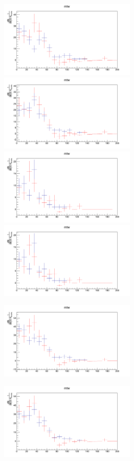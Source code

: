 \begin{figure}[H!]
\begin{center}
\includegraphics[width=6.5cm]{figures/2J1T/MTW_QCD_lessiso_vs_antiso_SR.png}
\includegraphics[width=6.5cm]{figures/2J1T/MTW_QCD_moreiso_vs_antiso_SR.png}
\includegraphics[width=6.5cm]{figures/2J1T/MTW_QCD_lessiso_vs_antiso_SB.png}
\includegraphics[width=6.5cm]{figures/2J1T/MTW_QCD_lessiso_vs_antiso_SB.png}
\includegraphics[width=6.5cm, height=4.4cm]{figures/2J1T/MTW_QCD_lessiso_vs_antiso_inclusive_mTop.png}
\includegraphics[width=6.5cm]{figures/2J1T/MTW_QCD_moreiso_vs_antiso_inclusive_mTop.png}\hfill

\end{center}
\end{figure}
